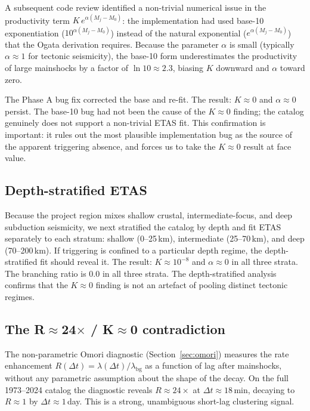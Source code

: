 \documentclass[10pt,a4paper,twocolumn]{article}
\begin{document}
A subsequent code review identified a non-trivial numerical issue in the productivity term $K\,e^{\alpha(M_j - M_0)}$: the implementation had used base-10 exponentiation ($10^{\alpha(M_j-M_0)}$) instead of the natural exponential ($e^{\alpha(M_j-M_0)}$) that the Ogata derivation requires. Because the parameter $\alpha$ is small (typically $\alpha\approx1$ for tectonic seismicity), the base-10 form underestimates the productivity of large mainshocks by a factor of $\ln 10 \approx 2.3$, biasing $K$ downward and $\alpha$ toward zero.

The Phase A bug fix corrected the base and re-fit. The result: $K\approx0$ and $\alpha\approx0$ persist. The base-10 bug had not been the cause of the $K\approx0$ finding; the catalog genuinely does not support a non-trivial ETAS fit. This confirmation is important: it rules out the most plausible implementation bug as the source of the apparent triggering absence, and forces us to take the $K\approx0$ result at face value.

\subsection{Depth-stratified ETAS}

Because the project region mixes shallow crustal, intermediate-focus, and deep subduction seismicity, we next stratified the catalog by depth and fit ETAS separately to each stratum: shallow (0--25\,km), intermediate (25--70\,km), and deep (70--200\,km). If triggering is confined to a particular depth regime, the depth-stratified fit should reveal it. The result: $K\approx10^{-8}$ and $\alpha\approx0$ in all three strata. The branching ratio is 0.0 in all three strata. The depth-stratified analysis confirms that the $K\approx0$ finding is not an artefact of pooling distinct tectonic regimes.

\subsection{The R$\approx$24$\times$ / K$\approx$0 contradiction}

The non-parametric Omori diagnostic (Section~\ref{sec:omori}) measures the rate enhancement $R(\Delta t) = \lambda(\Delta t) / \lambda_{\text{bg}}$ as a function of lag after mainshocks, without any parametric assumption about the shape of the decay. On the full 1973--2024 catalog the diagnostic reveals $R\approx24\times$ at $\Delta t\approx18$\,min, decaying to $R\approx1$ by $\Delta t\approx1$\,day. This is a strong, unambiguous short-lag clustering signal.
\end{document}
